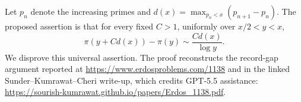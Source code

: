 Let \(p_n\) denote the increasing primes and
\(d(x)=\max_{p_n<x}(p_{n+1}-p_n)\).
The proposed assertion is that for every fixed \(C>1\), uniformly over \(x/2<y<x\),
\[
 \pi(y+Cd(x))-\pi(y)\sim \frac{Cd(x)}{\log y}.
\]
We disprove this universal assertion. The proof reconstructs the record-gap argument reported at \url{https://www.erdosproblems.com/1138} and in the linked Sunder--Kumrawat--Cheri write-up, which credits GPT-5.5 assistance:
\url{https://sourish-kumrawat.github.io/papers/Erdos_1138.pdf}.

